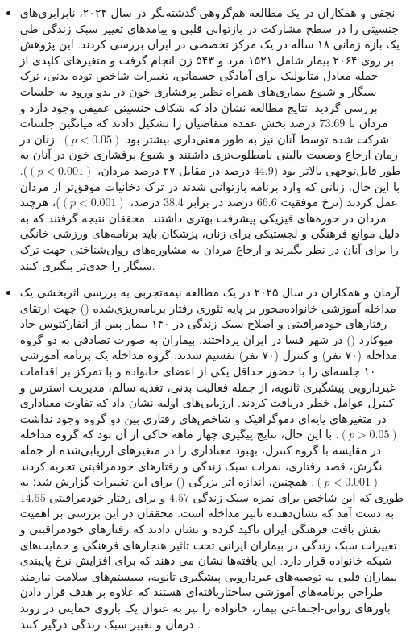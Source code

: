 \begin{itemize}
\item نجفی و همکاران در یک مطالعه هم‌گروهی گذشته‌نگر در سال ۲۰۲۴، نابرابری‌های جنسیتی را در سطح مشارکت در بازتوانی قلبی و پیامدهای تغییر سبک زندگی طی یک بازه زمانی ۱۸ ساله در یک مرکز تخصصی در ایران بررسی کردند. این پژوهش بر روی ۲۰۶۴ بیمار شامل ۱۵۲۱ مرد و ۵۴۳ زن انجام گرفت و متغیرهای کلیدی از جمله معادل متابولیک برای آمادگی جسمانی، تغییرات شاخص توده بدنی، ترک سیگار و شیوع بیماری‌های همراه نظیر پرفشاری خون در بدو ورود به جلسات بررسی گردید. نتایج مطالعه نشان داد که شکاف جنسیتی عمیقی وجود دارد و مردان با $73.69$ درصد بخش عمده متقاضیان را تشکیل دادند که میانگین جلسات شرکت شده توسط آنان نیز به طور معنی‌داری بیشتر بود $(p<0.05)$. زنان در زمان ارجاع وضعیت بالینی نامطلوب‌تری داشتند و شیوع پرفشاری خون در آنان به طور قابل‌توجهی بالاتر بود ($44.9$ درصد در مقابل ۲۷ درصد مردان، $(p<0.001)$). با این حال، زنانی که وارد برنامه بازتوانی شدند در ترک دخانیات موفق‌تر از مردان عمل کردند (نرخ موفقیت $66.6$ درصد در برابر $38.4$ درصد، $(p<0.001)$)، هرچند مردان در حوزه‌های فیزیکی پیشرفت بهتری داشتند. محققان نتیجه گرفتند که به دلیل موانع فرهنگی و لجستیکی برای زنان، پزشکان باید برنامه‌های ورزشی خانگی را برای آنان در نظر بگیرند و ارجاع مردان به مشاوره‌های روان‌شناختی جهت ترک سیگار را جدی‌تر پیگیری کنند. \cite{Najafi2024Gender}

\item آرمان و همکاران در سال ۲۰۲۵ در یک مطالعه نیمه‌تجربی به بررسی اثربخشی یک مداخله آموزشی خانواده‌محور بر پایه تئوری رفتار برنامه‌ریزی‌شده () جهت ارتقای رفتارهای خودمراقبتی و اصلاح سبک زندگی در ۱۴۰ بیمار پس از انفارکتوس حاد میوکارد () در شهر فسا در ایران پرداختند. بیماران به صورت تصادفی به دو گروه مداخله (۷۰ نفر) و کنترل (۷۰ نفر) تقسیم شدند. گروه مداخله یک برنامه آموزشی ۱۰ جلسه‌ای را با حضور حداقل یکی از اعضای خانواده و با تمرکز بر اقدامات غیردارویی پیشگیری ثانویه، از جمله فعالیت بدنی، تغذیه سالم، مدیریت استرس و کنترل عوامل خطر دریافت کردند. ارزیابی‌های اولیه نشان داد که تفاوت معناداری در متغیرهای پایه‌ای دموگرافیک و شاخص‌های رفتاری بین دو گروه وجود نداشت $(p>0.05)$. با این حال، نتایج پیگیری چهار ماهه حاکی از آن بود که گروه مداخله در مقایسه با گروه کنترل، بهبود معناداری را در متغیرهای ارزیابی‌شده از جمله نگرش، قصد رفتاری، نمرات سبک زندگی و رفتارهای خودمراقبتی تجربه کردند $(p<0.001)$. همچنین، اندازه اثر بزرگی () برای این تغییرات گزارش شد؛ به طوری که این شاخص برای نمره سبک زندگی $4.57$ و برای رفتار خودمراقبتی $14.55$ به دست آمد که نشان‌دهنده تاثیر مداخله است. محققان در این بررسی بر اهمیت نقش بافت فرهنگی ایران تاکید کرده و نشان دادند که رفتارهای خودمراقبتی و تغییرات سبک زندگی در بیماران ایرانی تحت تاثیر هنجارهای فرهنگی و حمایت‌های شبکه‌ خانواده قرار دارد. این یافته‌ها نشان می دهند که برای افزایش نرخ پایبندی بیماران قلبی به توصیه‌های غیردارویی پیشگیری ثانویه، سیستم‌های سلامت نیازمند طراحی برنامه‌های آموزشی ساختاریافته‌ای هستند که علاوه بر هدف قرار دادن باورهای روانی-اجتماعی بیمار، خانواده را نیز به عنوان یک بازوی حمایتی در روند درمان و تغییر سبک زندگی درگیر کنند \cite{Arman2025FamilySupported}.
\end{itemize}





